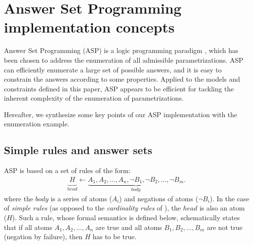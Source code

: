 \section{Answer Set Programming implementation concepts}\label{sec:impl}

\newcommand{\atom}[1]{#1}
\newcommand{\predicate}[1]{\mathit{#1}}
\newcommand{\la}{\leftarrow}
\newcommand{\var}[1]{#1}
\newcommand{\nota}{\neg}

\newcommand{\paramlabel}{\predicate{param\_label}}
\newcommand{\paramres}{\predicate{param\_resource}}
\newcommand{\component}{\predicate{component}}
\newcommand{\componentlevels}{\predicate{component\_levels}}
\newcommand{\param}{\predicate{param}}
\newcommand{\inferedparam}{\predicate{infered\_param}}
\newcommand{\lessactive}{\predicate{less\_active}}
\newcommand{\paraminf}{\predicate{param\_inf}}



Answer Set Programming (ASP) is a logic programming paradigm \cite{Baral03, Baral10},
which has been chosen to address the enumeration of all admissible parametrizations.
ASP can efficiently enumerate a large set of possible answers,
  and it is easy to constrain the answers according to some properties.
Applied to the models and constraints defined in this paper,
ASP appears to be efficient for tackling the inherent complexity of the enumeration of parametrizations.

Hereafter, we synthesize some key points of our ASP implementation with the enumeration example.



\subsection{Simple rules and answer sets}\label{sssec:simple_rules}
ASP is based on a set of rules of the form:
\begin{align*}
  \underbrace{{\ }\atom{H}_{\ }}_{head} \la \underbrace{\atom{A}_1, \atom{A}_2, \dots, \atom{A}_n, \nota \atom{B}_1, \nota \atom{B}_2, \dots, \nota \atom{B}_m}_{body}.
\end{align*}
where the $body$ is a series of atoms ($\atom{A}_i$) and negations of atoms ($\nota \atom{B}_i$).
In the case of \emph{simple rules} (as opposed to the \emph{cardinality rules} of ), the $head$ is also an atom ($\atom{H}$).
Such a rule, whose formal semantics is defined below,
schematically states that if all atoms $\atom{A}_1, \atom{A}_2, \dots, \atom{A}_n$ are true
and all atoms $\atom{B}_1, \atom{B}_2, \dots, \atom{B}_m$ are not true (negation by failure), then $\atom{H}$ has to be true.

